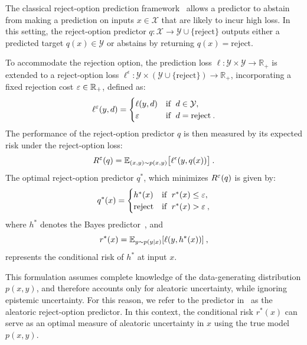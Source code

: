 The classical reject-option prediction framework~\cite{Chow-RejectOpt-TIT1970} allows a predictor to abstain from making a prediction on inputs $x \in \mathcal{X}$ that are likely to incur high loss. In this setting, the reject-option predictor $q: \mathcal{X} \rightarrow \mathcal{Y} \cup \{ \text{reject} \}$ outputs either a predicted target $q(x) \in \mathcal{Y}$ or abstains by returning $q(x) = \text{reject}$.

To accommodate the rejection option, the prediction loss $\ell \colon \mathcal{Y} \times \mathcal{Y} \rightarrow \mathbb{R}_+$ is extended to a reject-option loss $\ell^\epsilon: \mathcal{Y} \times (\mathcal{Y} \cup \{\text{reject}\}) \rightarrow \mathbb{R}_+$, incorporating a fixed rejection cost $\varepsilon \in \mathbb{R}_+$, defined as:
%
\begin{align}
\label{equ:rejectOptLoss}
\ell^\varepsilon(y,d) = 
\begin{cases}
\ell(y,d) & \text{if }\; d\in\mathcal{Y},\\
\varepsilon & \text{if }\; d = \text{reject}\:.
\end{cases}
\end{align}
%
The performance of the reject-option predictor $q$ is then measured by its expected risk under the reject-option loss:
\begin{equation}
  \label{equ:ExpRiskRejectOption}
   R^\varepsilon(q) = {\mathbb{E}}_{(x,y)\sim p(x,y)}\big [ \ell^\epsilon(y,q(x)) \big ] \:.
\end{equation}
%
The optimal reject-option predictor $q^*$, which minimizes $R^\varepsilon(q)$ is given by:
\begin{equation}
\label{equ:BayesOptimalPred}
   q^*(x) = \begin{cases}
   h^*(x) & \text{if }\; r^*(x)\leq \varepsilon,\\
     \text{reject} & \text{if }\; r^*(x) > \varepsilon\:,   
    \end{cases}
\end{equation}
%
where $h^*$ denotes the Bayes predictor~, and 
\begin{equation}
\label{equ:condRisk}
   r^*(x) = {\mathbb{E}}_{y\sim p(y|x)}[\ell(y,h^*(x))] \:,
\end{equation}
%
represents the conditional risk of $h^*$ at input $x$.

This formulation assumes complete knowledge of the data-generating distribution $p(x, y)$, and therefore accounts only for aleatoric uncertainty, while ignoring epistemic uncertainty. For this reason, we refer to the predictor in~ as the aleatoric reject-option predictor. In this context, the conditional risk $r^*(x)$ can serve as an optimal measure of aleatoric uncertainty in $x$ using the true model $p(x,y)$.

